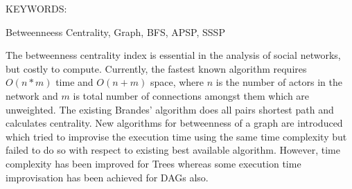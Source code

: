 \abstract

\noindent KEYWORDS: \hspace*{0.5em} \parbox[t]{4.4in}{Betweenneess Centrality, Graph, BFS, APSP, SSSP}

\vspace*{24pt}

The betweenness centrality index is essential in the analysis of social networks, but costly to compute. Currently, the fastest known algorithm requires $O(n*m)$ time and $O(n+m)$ space, where $n$ is the number of actors in the network and $m$ is total number of connections amongst them which are unweighted. The existing  Brandes' algorithm does all pairs shortest path and calculates centrality. New algorithms for betweenness of a graph are introduced which tried to improvise the execution time using the same time complexity but failed to do so with respect to existing best available algorithm. However, time complexity has been improved for Trees whereas some execution time improvisation has been achieved for DAGs also.
\pagebreak